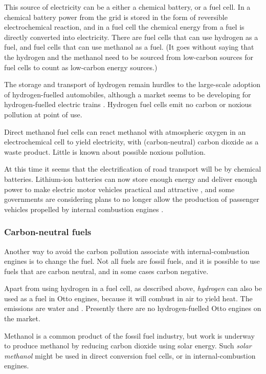 This source of electricity can be a either a chemical battery, or a fuel cell.
In a chemical battery power from the grid is stored in the form of reversible
electrochemical reaction, and in a fuel cell the chemical energy from a fuel is
directly converted into electricity. There are fuel cells that can use hydrogen
as a fuel, and fuel cells that can use methanol as a fuel. (It goes without
saying that the hydrogen and the methanol need to be sourced from low-carbon
sources for fuel cells to count as low-carbon energy sources.)

The storage and transport of hydrogen remain hurdles to the large-scale adoption
of hydrogen-fuelled automobiles, although a market seems to be developing for
hydrogen-fuelled electric trains \autocite{theguardian_2018}. Hydrogen fuel cells
emit no carbon or noxious pollution at point of use.

Direct methanol fuel cells can react methanol with atmospheric oxygen in an
electrochemical cell to yield electricity, with (carbon-neutral) carbon dioxide
as a waste product. Little is known about possible noxious pollution.

At this time it seems that the electrification of road transport will be by
chemical batteries. Lithium-ion batteries can now store enough energy and
deliver enough power to make electric motor vehicles practical and
attractive \autocite{Hayes2011}, and some governments are considering plans to no
longer allow the production of passenger vehicles propelled by internal
combustion engines \autocite{Burke-Kennedy2018} \autocite{Reuters2018}
\autocite{Gabbatiss2018}.

\subsubsection{Carbon-neutral fuels} 

Another way to avoid the carbon pollution associate with internal-combustion
engines is to change the fuel. Not all fuels are fossil fuels, and it is
possible to use fuels that are carbon neutral, and in some cases carbon
negative.

Apart from using hydrogen in a fuel cell, as described above, \textit{hydrogen}
can also be used as a fuel in Otto engines, because it will combust in air to
yield heat. The emissions are water and \nox. Presently there are no
hydrogen-fuelled Otto engines on the market.

Methanol is a common product of the fossil fuel industry, but work is underway
to produce methanol by reducing carbon dioxide using solar energy. Such
\textit{solar methanol} might be used in direct conversion fuel cells, or in
internal\hyp{}combustion engines.

